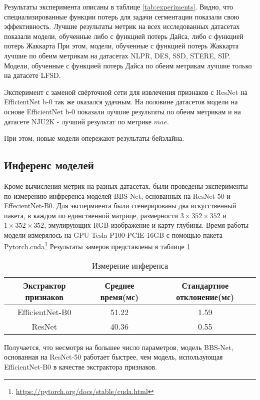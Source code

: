 Результаты эксперимента описаны в таблице \ref{tab:experiments}.
Видно, что специализированные функции потерь для задачи сегментации
показали свою эффективность. Лучшие результаты метрик на всех исследованных
датасетах показали модели, обученные либо с функцией потерь Дайса, либо с функцией потерь Жаккарта
При этом, модели, обученные с функцией потерь Жаккарта лучшие по обеим метрикам
на датасетах NLPR, DES, SSD, STERE, SIP. Модели, обученные с функцией потерь Дайса
по обеим метрикам лучшие только на датасете LFSD.

Эксперимент с заменой свёрточной сети для извлечения признаков с ResNet на EfficientNet b-0
так же оказался удачным. На половине датасетов модели на основе EfficientNet b-0 показали
лучшие результаты по обеим метрикам и на датасете NJU2K - лучший результат по метрике $mae$.

При этом, новые модели опережают результаты бейзлайна.


\subsection{Инференс моделей}

Кроме вычисления метрик на разных датасетах, были проведены эксперименты по измерению
инфреренса моделей BBS-Net, основанных на ResNet-50 и EffecientNet-B0.
Для экспермиента были сгенерированы два искусственный пакета, в каждом по единственной матрице, размерности
$3 \times 352 \times 352$ и $1 \times 352 \times 352$, эмулирующих RGB изображение и карту глубины.
Время работы модели измерялось на GPU Tesla P100-PCIE-16GB с помощью пакета Pytorch.cuda\footnote{\url{https://pytorch.org/docs/stable/cuda.html}}
Результаты замеров представлены в таблице \ref{tab:inference}

\begin{center}
    \begin{table}
        \begin{tabular}{ |c|c|c| }
            \hline
            Экстрактор признаков & Среднее время(мс) & Стандартное отклонение(мс) \\
            \hline
            EfficientNet-B0&51.22&1.59\\
            \hline
            ResNet&40.36&0.55 \\
            \hline
        \end{tabular}
        \caption{Измерение инференса}
        \label{tab:inference}
        \end{table}
    \end{center}

Получается, что несмотря на большее число параметров, модель BBS-Net, основанная на ResNet-50 работает быстрее, чем модель, использующая EfficientNet-B0 в качестве
экстрактора признаков.